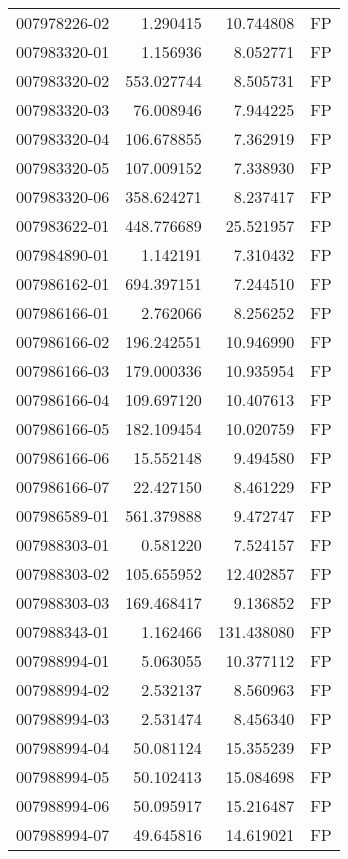 \begin{tabular}{lrrl}
007978226-02 &    1.290415 &    10.744808 &   FP \\
007983320-01 &    1.156936 &     8.052771 &   FP \\
007983320-02 &  553.027744 &     8.505731 &   FP \\
007983320-03 &   76.008946 &     7.944225 &   FP \\
007983320-04 &  106.678855 &     7.362919 &   FP \\
007983320-05 &  107.009152 &     7.338930 &   FP \\
007983320-06 &  358.624271 &     8.237417 &   FP \\
007983622-01 &  448.776689 &    25.521957 &   FP \\
007984890-01 &    1.142191 &     7.310432 &   FP \\
007986162-01 &  694.397151 &     7.244510 &   FP \\
007986166-01 &    2.762066 &     8.256252 &   FP \\
007986166-02 &  196.242551 &    10.946990 &   FP \\
007986166-03 &  179.000336 &    10.935954 &   FP \\
007986166-04 &  109.697120 &    10.407613 &   FP \\
007986166-05 &  182.109454 &    10.020759 &   FP \\
007986166-06 &   15.552148 &     9.494580 &   FP \\
007986166-07 &   22.427150 &     8.461229 &   FP \\
007986589-01 &  561.379888 &     9.472747 &   FP \\
007988303-01 &    0.581220 &     7.524157 &   FP \\
007988303-02 &  105.655952 &    12.402857 &   FP \\
007988303-03 &  169.468417 &     9.136852 &   FP \\
007988343-01 &    1.162466 &   131.438080 &   FP \\
007988994-01 &    5.063055 &    10.377112 &   FP \\
007988994-02 &    2.532137 &     8.560963 &   FP \\
007988994-03 &    2.531474 &     8.456340 &   FP \\
007988994-04 &   50.081124 &    15.355239 &   FP \\
007988994-05 &   50.102413 &    15.084698 &   FP \\
007988994-06 &   50.095917 &    15.216487 &   FP \\
007988994-07 &   49.645816 &    14.619021 &   FP \\

\end{tabular}
